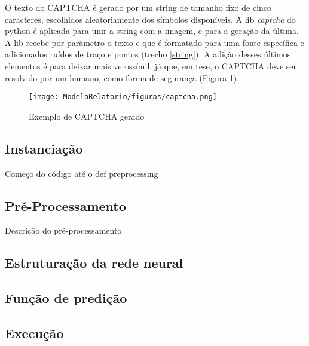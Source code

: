 O texto do CAPTCHA é gerado por um string de tamanho fixo de cinco caracteres, escolhidos aleatoriamente dos símbolos disponíveis. A lib \textit{captcha} do python é aplicada para unir a string com a imagem, e para a geração da última. A lib recebe por parâmetro o texto e que é formatado para uma fonte específica e adicionados ruídos de traço e pontos (trecho \ref{string}). A adição desses últimos elementos é para deixar mais verossímil, já que, em tese, o CAPTCHA deve ser resolvido por um humano, como forma de segurança (Figura \ref{fig:captcha}).



\begin{figure}
    \centering
    \texttt{[image: ModeloRelatorio/figuras/captcha.png]}
    \caption{Exemplo de CAPTCHA gerado}
    \label{fig:captcha}
\end{figure}

\subsection{Instanciação}
Começo do código até o def preprocessing

\subsection{Pré-Processamento}

Descrição do pré-processamento

\subsection{Estruturação da rede neural}

\subsection{Função de predição}

\subsection{Execução}
